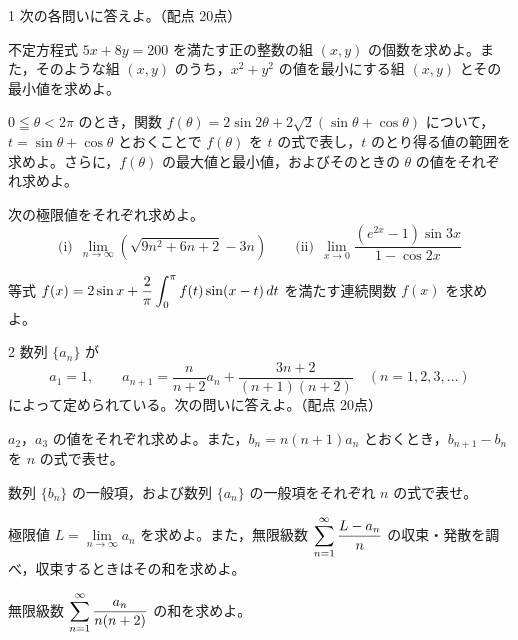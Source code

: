 \begin{monsheet}

\begin{daimon}{1}
次の各問いに答えよ。\hfill（配点 20点）
\begin{shomon}
  \item 不定方程式 $5x+8y=200$ を満たす正の整数の組 $(x, y)$ の個数を求めよ。また，そのような組 $(x, y)$ のうち，$x^{2}+y^{2}$ の値を最小にする組 $(x, y)$ とその最小値を求めよ。
  \item $0\leqq\theta<2\pi$ のとき，関数 $f(\theta)=2\sin 2\theta+2\sqrt{2}(\sin\theta+\cos\theta)$ について，$t=\sin\theta+\cos\theta$ とおくことで $f(\theta)$ を $t$ の式で表し，$t$ のとり得る値の範囲を求めよ。さらに，$f(\theta)$ の最大値と最小値，およびそのときの $\theta$ の値をそれぞれ求めよ。
  \item 次の極限値をそれぞれ求めよ。
  \[
    \text{(i)}\ \ \lim_{n\to\infty}\left(\sqrt{9n^{2}+6n+2}-3n\right)
    \qquad
    \text{(ii)}\ \ \lim_{x\to 0}\frac{(e^{2x}-1)\sin 3x}{1-\cos 2x}
  \]
  \item 等式 $\displaystyle f(x)=2\sin x+\frac{2}{\pi}\int_{0}^{\pi}f(t)\sin(x-t)\,dt$ を満たす連続関数 $f(x)$ を求めよ。
\end{shomon}
\end{daimon}

\begin{daimon}{2}
数列 $\{a_{n}\}$ が
\[
  a_{1} = 1,\qquad
  a_{n+1} = \frac{n}{n+2}a_{n} + \frac{3n+2}{(n+1)(n+2)} \quad (n=1, 2, 3, \ldots)
\]
によって定められている。次の問いに答えよ。\hfill（配点 20点）
\begin{shomon}
  \item $a_{2}$，$a_{3}$ の値をそれぞれ求めよ。また，$b_{n}=n(n+1)a_{n}$ とおくとき，$b_{n+1}-b_{n}$ を $n$ の式で表せ。
  \item 数列 $\{b_{n}\}$ の一般項，および数列 $\{a_{n}\}$ の一般項をそれぞれ $n$ の式で表せ。
  \item 極限値 $L=\lim\limits_{n\to\infty}a_{n}$ を求めよ。また，無限級数 $\displaystyle\sum_{n=1}^{\infty}\frac{L-a_{n}}{n}$ の収束・発散を調べ，収束するときはその和を求めよ。
  \item 無限級数 $\displaystyle\sum_{n=1}^{\infty}\frac{a_{n}}{n(n+2)}$ の和を求めよ。
\end{shomon}
\end{daimon}


\end{monsheet}

